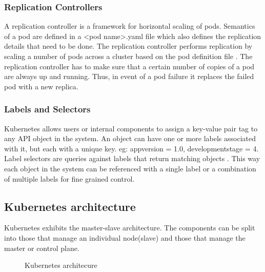 \documentclass[9pt,twocolumn,twoside]{../../styles/osajnl}
\begin{document}
\subsubsection{Replication Controllers}
A replication controller is a framework for horizontal scaling of
pods. Semantics of a pod are defined in a <pod\textunderscore
name>.yaml file which also defines the replication details that need
to be done. The replication controller performs replication by scaling
a number of pods across a cluster based on the pod definition file
\cite{www-wiki-kubernetes}. The replication controller has to make
sure that a certain number of copies of a pod are always up and
running. Thus, in event of a pod failure it replaces the failed pod
with a new replica.

\subsubsection{Labels and Selectors}
Kubernetes allows users or internal components to assign a key-value
pair tag to any API object in the system. An object can have one or
more labels associated with it, but each with a unique key. eg:
appversion = 1.0, development\textunderscore stage = 4.  Label
selectors are queries against labels that return matching objects
\cite{www-kubernetes-digitalocean}. This way each object in the system
can be referenced with a single label or a combination of multiple
labels for fine grained control.

\subsection{Kubernetes architecture}
Kubernetes exhibits the master-slave architecture. The components can
be split into those that manage an individual node(slave) and those
that manage the master or control plane.

\begin{figure}[htbp]
\centering
{}
\caption{Kubernetes architecure \cite{www-kubernetes-architecture}}
\label{fig:Kubernetes Minimum Architecture}
\end{figure}
\end{document}
